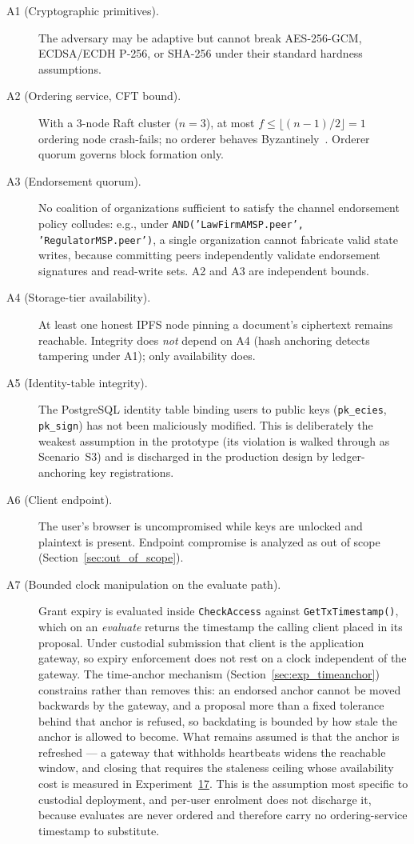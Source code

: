 \documentclass[preprint,12pt]{elsarticle}
\begin{document}
\begin{description}
\item[A1 (Cryptographic primitives).] The adversary may be adaptive
but cannot break AES-256-GCM, ECDSA/ECDH P-256, or SHA-256 under
their standard hardness assumptions.
\item[A2 (Ordering service, CFT bound).] With a 3-node Raft cluster
($n{=}3$), at most $f \leq \lfloor(n-1)/2\rfloor = 1$ ordering node
crash-fails; no orderer behaves Byzantinely~\cite{Ongaro2014}.
Orderer quorum governs block formation only.
\item[A3 (Endorsement quorum).] No coalition of organizations
sufficient to satisfy the channel endorsement policy colludes: e.g.,
under \texttt{AND(}\allowbreak\texttt{'LawFirmAMSP.peer',}\allowbreak
\texttt{'RegulatorMSP.peer')}, a single organization cannot
fabricate valid state writes, because committing peers independently
validate endorsement signatures and read-write sets. A2 and A3 are
independent bounds.
\item[A4 (Storage-tier availability).] At least one honest IPFS node
pinning a document's ciphertext remains reachable. Integrity does
\emph{not} depend on A4 (hash anchoring detects tampering under A1);
only availability does.
\item[A5 (Identity-table integrity).] The PostgreSQL identity table
binding users to public keys (\texttt{pk\_ecies}, \texttt{pk\_sign})
has not been maliciously modified. This is deliberately the weakest
assumption in the prototype (its violation is walked through as
Scenario~S3) and is discharged in the production design by
ledger-anchoring key registrations.
\item[A6 (Client endpoint).] The user's browser is uncompromised
while keys are unlocked and plaintext is present. Endpoint
compromise is analyzed as out of scope
(Section~\ref{sec:out_of_scope}).
\item[A7 (Bounded clock manipulation on the evaluate path).] Grant
expiry is evaluated inside \texttt{CheckAccess} against
\texttt{GetTxTimestamp()}, which on an \emph{evaluate} returns the
timestamp the calling client placed in its proposal. Under custodial
submission that client is the application gateway, so expiry
enforcement does not rest on a clock independent of the gateway.
The time-anchor mechanism
(Section~\ref{sec:exp_timeanchor}) constrains rather than removes this:
an endorsed anchor cannot be moved backwards by the gateway, and a
proposal more than a fixed tolerance behind that anchor is refused, so
backdating is bounded by how stale the anchor is allowed to become.
What remains assumed is that the anchor is refreshed --- a gateway that
withholds heartbeats widens the reachable window, and closing that
requires the staleness ceiling whose availability cost is measured in
Experiment~\hyperref[sec:exp_timeanchor]{17}. This is the assumption most
specific to custodial deployment, and per-user enrolment does not
discharge it, because evaluates are never ordered and therefore carry no
ordering-service timestamp to substitute.
\end{description}
\end{document}
